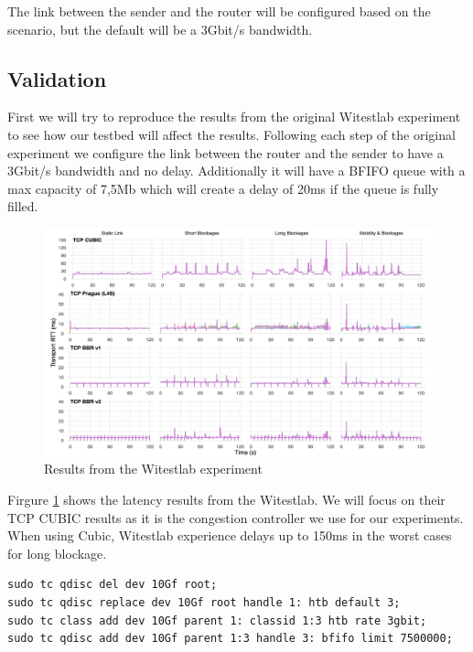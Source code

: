 \documentclass[a4paper,english, 11pt]{report}
\begin{document}
The link between the sender and the router will be configured based on the scenario, but the default will be a 3Gbit/s bandwidth.

\subsection{Validation}

First we will try to reproduce the results from the original Witestlab experiment to see how our testbed will affect the results.
Following each step of the original experiment we configure the link between the router and the sender to have a 3Gbit/s bandwidth and no delay. Additionally it will have a BFIFO queue with a max capacity of 7,5Mb which will create a delay of 20ms if the queue is fully filled.\\

\begin{figure}[h!] %
	\centering
	\includegraphics[scale=0.25]{../diagrams/witestlab/witestlab_results.png}
  	\caption{Results from the Witestlab experiment~\cite{Srivastava_Fund_Panwar_2020}}
  	\label{fig:witestlab_results}
\end{figure}

Firgure \ref{fig:witestlab_results} shows the latency results from the Witestlab. We will focus on their TCP CUBIC results as it is the congestion controller we use for our experiments. When using Cubic, Witestlab experience delays up to 150ms in the worst cases for long blockage.

\begin{verbatim}
sudo tc qdisc del dev 10Gf root; 
sudo tc qdisc replace dev 10Gf root handle 1: htb default 3;
sudo tc class add dev 10Gf parent 1: classid 1:3 htb rate 3gbit;
sudo tc qdisc add dev 10Gf parent 1:3 handle 3: bfifo limit 7500000;
\end{verbatim}\\
\end{document}
